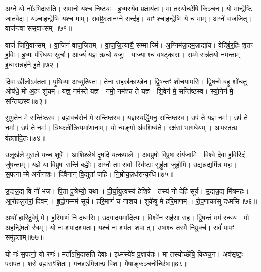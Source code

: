 अग्ने॒ यो नो॑\-ऽभि॒दास॑ति।
स॒मा॒नो यश्च॒ निष्ट्यः॑।
इ॒ध्मस्ये॑व प्र॒क्षाय॑तः।
मा तस्योच्छे॑षि॒ किञ्च॒न।
यो मान्द्वेष्टि॑ जातवेदः।
यञ्चा॒हन्द्वेष्मि॒ यश्च॒ माम्।
सर्वा॒ꣴ॒स्तान॑ग्ने॒ सन्द॑ह।
याꣳ श्चा॒हन्द्वेष्मि॒ ये च॒ माम्।
अग्ने॑ वाजजित्।
वाज॑न्त्वा ससृ॒वाꣳसम्॥७१॥

वाजं॑ जिगि॒वाꣳसम्।
वा॒जिनं॑ वाज॒जितम्।
वा॒ज॒जि॒त्यायै॒ सम्मार्ज्मि।
अ॒ग्निम॑न्ना॒दम॒न्नाद्या॑य।
वेदि॑र्ब॒र्॒हिः शृ॒तꣳ ह॒विः।
इ॒ध्मः प॑रि॒धयः॒ स्रुचः॑।
आज्यं॑ य॒ज्ञ ऋचो॒ यजुः॑।
या॒ज्याश्च वषट्का॒राः।
सम्मे॒ सन्न॑तयो नमन्ताम्।
इ॒ध्म॒स॒न्नह॑ने हु॒ते॥७२॥

दि॒वः खीलो\-ऽव॑ततः।
पृ॒थि॒व्या अध्युत्थि॑तः।
तेना॑ स॒हस्र॑काण्डेन।
द्वि॒षन्तꣳ॑ शोचयामसि।
द्वि॒षन्मे॑ ब॒हु शो॑चतु।
ओष॑धे॒ मो अ॒हꣳ शु॑चम्।
यज्ञ॒ नम॑स्ते यज्ञ।
नमो॒ नम॑श्च ते यज्ञ।
शि॒वेन॑ मे॒ सन्ति॑ष्ठस्व।
स्यो॒नेन॑ मे॒ सन्ति॑ष्ठस्व॥७३॥

सु॒भू॒तेन॑ मे॒ सन्ति॑ष्ठस्व।
ब्र॒ह्म॒व॒र्च॒सेन॑ मे॒ सन्ति॑ष्ठस्व।
य॒ज्ञस्यर्द्धि॒मनु॒ सन्ति॑ष्ठस्व।
उप॑ ते यज्ञ॒ नमः॑।
उप॑ ते॒ नमः॑।
उप॑ ते॒ नमः॑।
त्रिष्फ॒लीक्रि॒यमा॑णानाम्।
यो न्य॒ङ्गो अ॑व॒शिष्य॑ते।
रक्ष॑सां भाग॒धेयम्।
आप॒स्तत्प्र व॑हतादि॒तः॥७४॥

उ॒लूख॑ले॒ मुस॑ले॒ यच्च॒ शूर्पे।
आ॒शि॒श्लेष॑ दृ॒षदि॒ यत्क॒पाले।
अ॒व॒प्रुषो॑ वि॒प्रुषः॒ संय॑जामि।
विश्वे॑ दे॒वा ह॒विरि॒दं जु॑षन्ताम्।
य॒ज्ञे या वि॒प्रुषः॒ सन्ति॑ ब॒ह्वीः।
अ॒ग्नौ ताः सर्वाः॒ स्वि॑ष्टाः॒ सुहु॑ता जुहोमि।
उ॒द्यन्न॒द्यमि॑त्र महः।
स॒पत्नान्मे अनीनशः।
दिवै॑नान् वि॒द्युता॑ जहि।
नि॒म्रोच॒न्नध॑रान्कृधि॥७५॥

उ॒द्यन्न॒द्य वि नो॑ भज।
पि॒ता पु॒त्रेभ्यो॒ यथा।
दी॒र्घा॒यु॒त्वस्य॑ हेशिषे।
तस्य॑ नो देहि सूर्य।
उ॒द्यन्न॒द्य मि॑त्रमहः।
आ॒रोह॒न्नुत्त॑रां॒ दिवम्।
हृ॒द्रो॒गम्मम॑ सूर्य।
ह॒रि॒माणं॑ च नाशय।
शुके॑षु मे हरि॒माणम्।
रो॒प॒णाका॑सु दध्मसि॥७६॥

अथो॑ हारिद्र॒वेषु॑ मे।
ह॒रि॒माणं॒ नि द॑ध्मसि।
उद॑गाद॒यमा॑दि॒त्यः।
विश्वे॑न॒ सह॑सा स॒ह।
द्वि॒षन्तं॒ मम॑ र॒न्धय\sn{}।
मो अ॒हन्द्वि॑ष॒तो र॑धम्।
यो नः॒ शपा॒दश॑पतः।
यश्च॑ नः॒ शप॑तः॒ शपात्।
उ॒षाश्च॒ तस्मै॑ नि॒म्रुक्च॑।
सर्वं॑ पा॒पꣳ समू॑हताम्॥७७॥

यो नः॑ स॒पत्नो॒ यो रणः॑।
मर्तो॑\-ऽभि॒दास॑ति देवाः।
इ॒ध्मस्ये॑व प्र॒क्षाय॑तः।
मा तस्योच्छे॑षि॒ किञ्च॒न।
अव॑सृष्टः॒ परा॑पत।
श॒रो ब्रह्म॑सꣳशितः।
गच्छा॒\-ऽमित्रा॒न्प्र वि॑श।
मैषा॒ङ्कञ्च॒नोच्छि॑षः॥७८॥

